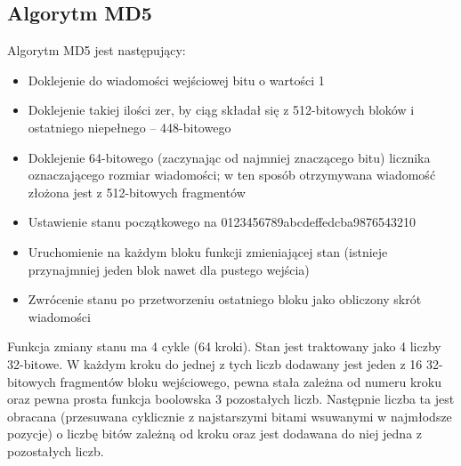 \documentclass[12pt, a4paper]{article}
\begin{document}
\subsection{Algorytm MD5}
Algorytm MD5 jest następujący:
\begin{itemize}
\item Doklejenie do wiadomości wejściowej bitu o wartości 1
\item Doklejenie takiej ilości zer, by ciąg składał się z 512-bitowych bloków i ostatniego niepełnego – 448-bitowego
\item Doklejenie 64-bitowego (zaczynając od najmniej znaczącego bitu) licznika oznaczającego rozmiar wiadomości; w ten sposób otrzymywana wiadomość złożona jest z 512-bitowych fragmentów
\item Ustawienie stanu początkowego na 0123456789abcdeffedcba9876543210
\item Uruchomienie na każdym bloku funkcji zmieniającej stan (istnieje przynajmniej jeden blok nawet dla pustego wejścia)
\item Zwrócenie stanu po przetworzeniu ostatniego bloku jako obliczony skrót wiadomości
\end{itemize}
Funkcja zmiany stanu ma 4 cykle (64 kroki). Stan jest traktowany jako 4 liczby 32-bitowe. W każdym kroku do jednej z tych liczb dodawany jest jeden z 16 32-bitowych fragmentów bloku wejściowego, pewna stała zależna od numeru kroku oraz pewna prosta funkcja boolowska 3 pozostałych liczb. Następnie liczba ta jest obracana (przesuwana cyklicznie z najstarszymi bitami wsuwanymi w najmłodsze pozycje) o liczbę bitów zależną od kroku oraz jest dodawana do niej jedna z pozostałych liczb.
\end{document}
